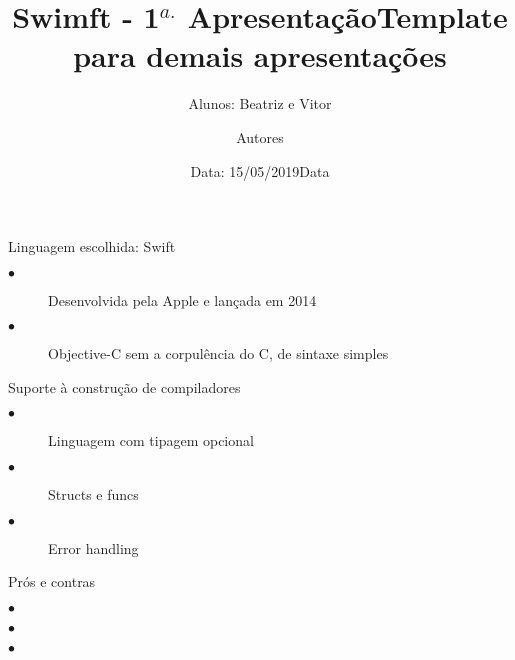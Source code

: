 \documentclass{beamer}
\title[Compiladores 2017.2]{Swimft - 1$^{a.}$ Apresentação}
\author[Abrev.]{Alunos: Beatriz e Vitor}
\institute[UFF]{Universidade Federal Fluminense}
\date{Data: 15/05/2019}
\begin{document}

\begin{frame}[plain]

\titlepage

\end{frame}


\begin{frame}{Linguagem escolhida: Swift}
\begin{description}
  \item[$\bullet$] Desenvolvida pela Apple e lançada em 2014
  \item[$\bullet$] Objective-C sem a corpulência do C, de sintaxe simples
\end{description}
\end{frame}


\begin{frame}{Suporte à construção de compiladores}
\begin{description}
  \item[$\bullet$] Linguagem com tipagem opcional
  \item[$\bullet$] Structs e funcs
  \item[$\bullet$] Error handling
\end{description}
\end{frame}


\begin{frame}{Prós e contras}
  \item[$\bullet$] 
  \item[$\bullet$] 
  \item[$\bullet$]
\end{frame}


\title[Compiladores 2017.2]{Template para demais apresentações}
\author[Abrev.]{Autores} 


\date{Data} 
\end{document}
